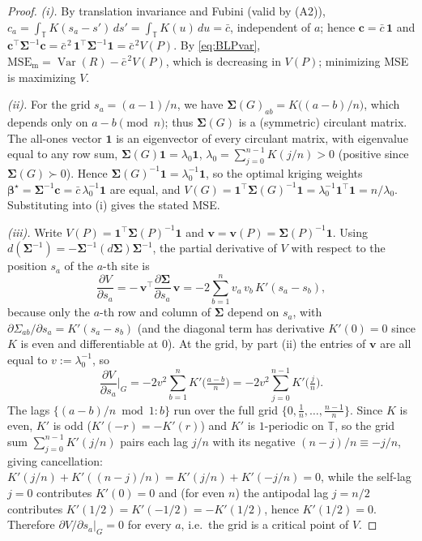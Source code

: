 \documentclass{amsart}
\theoremstyle{definition}
\newcommand{\Var}{\operatorname{Var}}
\begin{document}
\begin{proof}
\emph{(i).} By translation invariance and Fubini (valid by (A2)),
$c_a=\int_{\mathbb T}K(s_a-s')\,ds'=\int_{\mathbb T}K(u)\,du=\bar c$,
independent of $a$; hence $\mathbf c=\bar c\,\mathbf 1$ and
$\mathbf c^\top\boldsymbol\Sigma^{-1}\mathbf c=\bar c^{\,2}\,
\mathbf 1^\top\boldsymbol\Sigma^{-1}\mathbf 1=\bar c^{\,2}V(P)$. By
\eqref{eq:BLPvar}, $\mathrm{MSE}_{\mathrm m}=\Var(R)-\bar c^{\,2}V(P)$, which
is decreasing in $V(P)$; minimizing MSE is maximizing $V$.

\emph{(ii).} For the grid $s_a=(a-1)/n$, we have
$\boldsymbol\Sigma(G)_{ab}=K\big((a-b)/n\big)$, which depends only on
$a-b\pmod n$; thus $\boldsymbol\Sigma(G)$ is a (symmetric) circulant
matrix. The all-ones vector $\mathbf 1$ is an eigenvector of every
circulant matrix, with eigenvalue equal to any row sum,
$\boldsymbol\Sigma(G)\mathbf 1=\lambda_0\mathbf 1$,
$\lambda_0=\sum_{j=0}^{n-1}K(j/n)>0$ (positive since $\boldsymbol\Sigma(G)\succ0$).
Hence $\boldsymbol\Sigma(G)^{-1}\mathbf 1=\lambda_0^{-1}\mathbf 1$, so the
optimal kriging weights $\boldsymbol\beta^\star=\boldsymbol\Sigma^{-1}
\mathbf c=\bar c\,\lambda_0^{-1}\mathbf 1$ are equal, and
$V(G)=\mathbf 1^\top\boldsymbol\Sigma(G)^{-1}\mathbf 1=\lambda_0^{-1}
\mathbf 1^\top\mathbf 1=n/\lambda_0$. Substituting into (i) gives the stated MSE.

\emph{(iii).} Write $V(P)=\mathbf 1^\top\boldsymbol\Sigma(P)^{-1}\mathbf 1$ and
$\mathbf v=\mathbf v(P)=\boldsymbol\Sigma(P)^{-1}\mathbf 1$. Using
$d(\boldsymbol\Sigma^{-1})=-\boldsymbol\Sigma^{-1}(d\boldsymbol\Sigma)
\boldsymbol\Sigma^{-1}$, the partial derivative of $V$ with respect to the
position $s_a$ of the $a$-th site is
\[
\frac{\partial V}{\partial s_a}
=-\,\mathbf v^\top\frac{\partial\boldsymbol\Sigma}{\partial s_a}\,\mathbf v
=-2\sum_{b=1}^{n} v_a\,v_b\,K'(s_a-s_b),
\]
because only the $a$-th row and column of $\boldsymbol\Sigma$ depend on
$s_a$, with $\partial\Sigma_{ab}/\partial s_a=K'(s_a-s_b)$
(and the diagonal term has derivative $K'(0)=0$ since $K$ is even and
differentiable at $0$). At the grid, by part (ii) the entries of $\mathbf v$
are all equal to $v:=\lambda_0^{-1}$, so
\[
\frac{\partial V}{\partial s_a}\Big|_{G}
=-2v^2\sum_{b=1}^{n}K'\!\Big(\tfrac{a-b}{n}\Big)
=-2v^2\sum_{j=0}^{n-1}K'\!\Big(\tfrac{j}{n}\Big).
\]
The lags $\{(a-b)/n \bmod 1: b\}$ run over the full grid
$\{0,\tfrac1n,\dots,\tfrac{n-1}n\}$. Since $K$ is even, $K'$ is odd
($K'(-r)=-K'(r)$) and $K'$ is $1$-periodic on $\mathbb T$, so the grid sum
$\sum_{j=0}^{n-1}K'(j/n)$ pairs each lag $j/n$ with its negative
$(n-j)/n\equiv -j/n$, giving cancellation: $K'(j/n)+K'((n-j)/n)=
K'(j/n)+K'(-j/n)=0$, while the self-lag $j=0$ contributes $K'(0)=0$ and (for
even $n$) the antipodal lag $j=n/2$ contributes $K'(1/2)=K'(-1/2)=-K'(1/2)$,
hence $K'(1/2)=0$. Therefore $\partial V/\partial s_a|_G=0$ for every $a$,
i.e.\ the grid is a critical point of $V$.


\end{proof}
\end{document}

